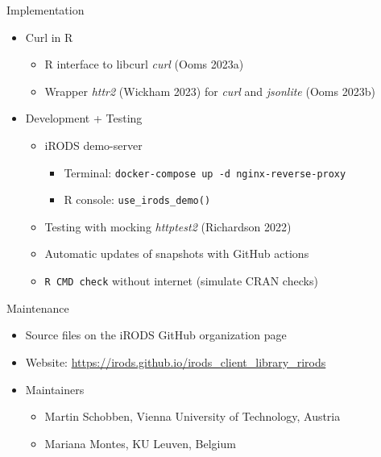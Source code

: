\documentclass[
  ignorenonframetext,
]{beamer}
\providecommand{\tightlist}{%
  \setlength{\itemsep}{0pt}\setlength{\parskip}{0pt}}\usepackage{longtable,booktabs,array}
\begin{document}
\begin{frame}[fragile]{Implementation}
\protect\hypertarget{implementation}{}
\begin{itemize}
\tightlist
\item
  Curl in R

  \begin{itemize}
  \tightlist
  \item
    R interface to libcurl \emph{curl} (Ooms 2023a)
  \item
    Wrapper \emph{httr2} (Wickham 2023) for \emph{curl} and
    \emph{jsonlite} (Ooms 2023b)
  \end{itemize}
\item
  Development + Testing

  \begin{itemize}
  \tightlist
  \item
    iRODS demo-server

    \begin{itemize}
    \tightlist
    \item
      Terminal: \texttt{docker-compose\ up\ -d\ nginx-reverse-proxy}
    \item
      R console: \texttt{use\_irods\_demo()}
    \end{itemize}
  \item
    Testing with mocking \emph{httptest2} (Richardson 2022)
  \item
    Automatic updates of snapshots with GitHub actions
  \item
    \texttt{R\ CMD\ check} without internet (simulate CRAN checks)
  \end{itemize}
\end{itemize}
\end{frame}

\begin{frame}{Maintenance}
\protect\hypertarget{maintenance}{}
\begin{itemize}
\tightlist
\item
  Source files on the iRODS GitHub organization page
\item
  Website: \url{https://irods.github.io/irods_client_library_rirods}
\item
  Maintainers

  \begin{itemize}
  \tightlist
  \item
    Martin Schobben, Vienna University of Technology, Austria
  \item
    Mariana Montes, KU Leuven, Belgium
  \end{itemize}
\end{itemize}
\end{frame}
\end{document}
